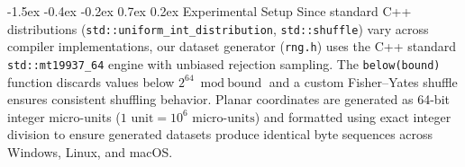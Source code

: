 \documentclass[10pt,twocolumn]{article}
\makeatletter
\renewcommand\section{\@startsection{section}{1}{\z@}%
  {-1.5ex \@plus -0.4ex \@minus -0.2ex}%
  {0.7ex \@plus 0.2ex}%
  {\normalfont\normalsize\bfseries}}
\makeatother
\begin{document}
\section{Experimental Setup}
Since standard C++ distributions (\texttt{std::uniform\_int\_distribution}, \texttt{std::shuffle}) vary across compiler implementations, our dataset generator (\texttt{rng.h}) uses the C++ standard \texttt{std::mt19937\_64} engine \cite{matsumoto1998mersenne} with unbiased rejection sampling. The \texttt{below(bound)} function discards values below $2^{64} \bmod \text{bound}$ and a custom Fisher--Yates shuffle ensures consistent shuffling behavior. Planar coordinates are generated as 64-bit integer micro-units ($1\text{ unit} = 10^6\text{ micro-units}$) and formatted using exact integer division to ensure generated datasets produce identical byte sequences across Windows, Linux, and macOS.
\end{document}
